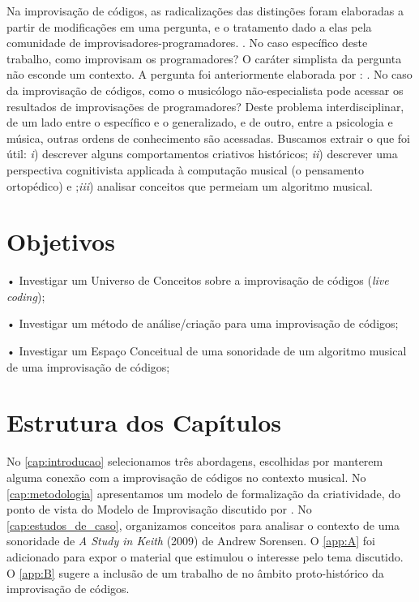 Na improvisação de códigos, as radicalizações das distinções foram elaboradas a partir de modificações em uma pergunta, e o tratamento dado a elas pela comunidade de improvisadores-programadores. \cite{pressing_improvisation_1987}. No caso específico deste trabalho, como improvisam os programadores? O caráter simplista da pergunta não esconde um contexto. A pergunta foi anteriormente elaborada por : . No caso da improvisação de códigos, como o musicólogo não-especialista pode acessar os resultados de improvisações de programadores? Deste problema interdisciplinar, de um lado entre o específico e o generalizado, e de outro, entre a psicologia e música, outras ordens de conhecimento são acessadas. Buscamos extrair o que foi útil: \emph{i}) descrever alguns comportamentos criativos históricos; \emph{ii}) descrever uma perspectiva cognitivista applicada à computação musical (o pensamento ortopédico) e ;\emph{iii}) analisar conceitos que permeiam um algoritmo musical. 

\section*{Objetivos}\label{sec:objetivos}

• Investigar um Universo de Conceitos sobre a improvisação de códigos (\emph{live coding});

• Investigar um método de análise/criação para uma improvisação de códigos;

• Investigar um Espaço Conceitual de uma sonoridade de um algoritmo musical de uma improvisação de códigos;

\section*{Estrutura dos Capítulos}

No \autoref{cap:introducao} selecionamos três abordagens, escolhidas por manterem alguma conexão com a improvisação de códigos no contexto musical.  No \autoref{cap:metodologia} apresentamos um modelo de formalização da criatividade, do ponto de vista do Modelo de Improvisação discutido por . No \autoref{cap:estudos_de_caso}, organizamos conceitos para analisar o contexto de uma sonoridade  de \emph{A Study in Keith} (2009) de Andrew Sorensen.  O \autoref{app:A} foi adicionado para expor o material que estimulou o interesse pelo tema discutido. O \autoref{app:B} sugere a inclusão de um trabalho de  no âmbito proto-histórico da improvisação de códigos.
